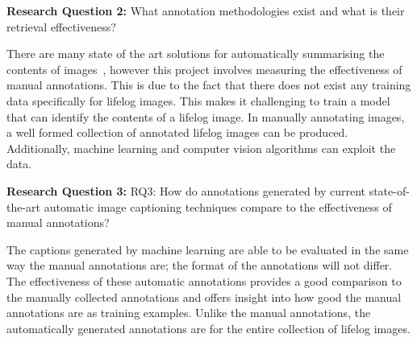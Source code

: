 \textbf{Research Question 2:} What annotation methodologies exist and what is their retrieval effectiveness?

There are many state of the art solutions for automatically summarising the contents of images~\cite{karpathy2015deep}\cite{jia2014caffe}\cite{pan2004gcap}, however this project involves measuring the effectiveness of manual annotations. This is due to the fact that there does not exist any training data specifically for lifelog images. This makes it challenging to train a model that can identify the contents of a lifelog image. In manually annotating images, a well formed collection of annotated lifelog images can be produced. Additionally, machine learning and computer vision algorithms can exploit the data.

\textbf{Research Question 3:} RQ3: How do annotations generated by current state-of-the-art automatic image captioning techniques compare to the effectiveness of manual annotations?

The captions generated by machine learning are able to be evaluated in the same way the manual annotations are; the format of the annotations will not differ. The effectiveness of these automatic annotations provides a good comparison to the manually collected annotations and offers insight into how good the manual annotations are as training examples. Unlike the manual annotations, the automatically generated annotations are for the entire collection of lifelog images. 